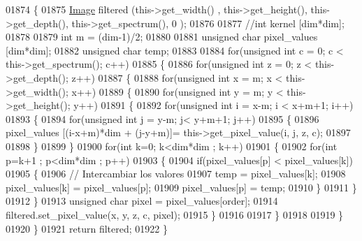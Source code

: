 \begin{DoxyCode}
01874 \{
01875     \hyperlink{class_image}{Image} filtered (this->get\_width() , this->get\_height(), this->get\_depth(), this->get\_spectrum(), 0
      ); 
01876     
01877     \textcolor{comment}{//int kernel [dim*dim];}
01878     
01879     \textcolor{keywordtype}{int} m = (dim-1)/2;
01880     
01881     \textcolor{keywordtype}{unsigned} \textcolor{keywordtype}{char} pixel\_values [dim*dim];
01882     \textcolor{keywordtype}{unsigned} \textcolor{keywordtype}{char} temp;
01883     
01884     \textcolor{keywordflow}{for}(\textcolor{keywordtype}{unsigned} \textcolor{keywordtype}{int} c = 0; c < this->get\_spectrum(); c++)
01885     \{
01886         \textcolor{keywordflow}{for}(\textcolor{keywordtype}{unsigned} \textcolor{keywordtype}{int} z = 0; z < this->get\_depth(); z++)
01887         \{
01888             \textcolor{keywordflow}{for}(\textcolor{keywordtype}{unsigned} \textcolor{keywordtype}{int} x = m; x < this->get\_width(); x++)
01889             \{
01890                 \textcolor{keywordflow}{for}(\textcolor{keywordtype}{unsigned} \textcolor{keywordtype}{int} y = m; y < this->get\_height(); y++)
01891                 \{
01892                     \textcolor{keywordflow}{for}(\textcolor{keywordtype}{unsigned} \textcolor{keywordtype}{int} i = x-m; i < x+m+1; i++)
01893                     \{
01894                         \textcolor{keywordflow}{for}(\textcolor{keywordtype}{unsigned} \textcolor{keywordtype}{int} j = y-m; j< y+m+1; j++)
01895                         \{
01896                             pixel\_values [(i-x+m)*dim + (j-y+m)]= this->get\_pixel\_value(i, j, z, c);
01897                             
01898                         \}   
01899                     \}
01900                     \textcolor{keywordflow}{for}(\textcolor{keywordtype}{int} k=0; k<dim*dim ; k++)
01901                     \{
01902                         \textcolor{keywordflow}{for}(\textcolor{keywordtype}{int} p=k+1 ; p<dim*dim ; p++)
01903                         \{
01904                             \textcolor{keywordflow}{if}(pixel\_values[p] < pixel\_values[k])
01905                             \{
01906                             \textcolor{comment}{// Intercambiar los valores}
01907                             temp = pixel\_values[k];
01908                             pixel\_values[k] = pixel\_values[p];
01909                             pixel\_values[p] = temp;
01910                             \}
01911                         \}
01912                     \}                   
01913                     \textcolor{keywordtype}{unsigned} \textcolor{keywordtype}{char} pixel = pixel\_values[order];
01914                     filtered.set\_pixel\_value(x, y, z, c, pixel);
01915                 \}
01916                 
01917              \}
01918              
01919          \}
01920     \}  
01921      \textcolor{keywordflow}{return} filtered;
01922 \}
\end{DoxyCode}
